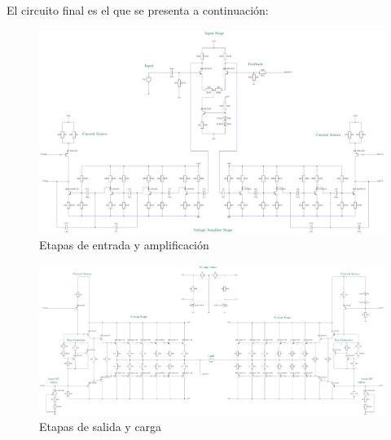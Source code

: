 


El circuito final es el que se presenta a continuación:
 \begin{figure}[H]
\centering
	\includegraphics[width=\textwidth]{ImagenesCaracteristicas/TEX1.pdf}
	\caption{Etapas de entrada y amplificación}
	\label{fig:circ}
\end{figure}
 \begin{figure}[H]
\centering
	\includegraphics[width=\textwidth]{ImagenesCaracteristicas/TEX2.pdf}
	\caption{Etapas de salida y carga}
	\label{fig:circ}
\end{figure}

